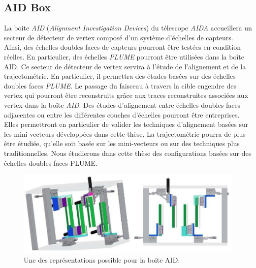   \subsection{AID Box}
  
  La boite \textit{AID} (\textit{Alignment Investigation Devices}) du t\'elescope \textit{AIDA} accueillera un secteur de d\'etecteur de vertex compos\'e d'un syst\`eme d'\'echelles de capteurs. Ainsi, des \'echelles doubles faces de capteurs pourront \^etre test\'ees en condition r\'eelles. En particulier, des \'echelles \textit{PLUME} pourront \^etre utilis\'ees dans la boîte AID. Ce secteur de d\'etecteur de vertex servira \`a l'\'etude de l'alignement et de la trajectom\'etrie. En particulier, il permettra des \'etudes bas\'ees sur des \'echelles doubles faces \textit{PLUME}. Le passage du faisceau à travers la cible engendre des vertex qui pourront \^etre reconstruits grâce aux traces reconstruites associ\'ees aux vertex dans la boîte \textit{AID}. Des \'etudes d'alignement entre \'echelles doubles faces adjacentes ou entre les diff\'erentes couches d'\'echelles pourront \^etre entreprises. Elles permettront en particulier de valider les techniques d'alignement bas\'ees sur les mini-vecteurs d\'evelopp\'ees dans cette th\`ese. La trajectom\'etrie pourra de plus \^etre \'etudi\'ee, qu'elle soit bas\'ee sur les mini-vecteurs ou sur des techniques plus traditionnelles. Nous \'etudierons dans cette th\`ese des configurations bas\'ees sur des \'echelles doubles faces PLUME.
  

  \begin{figure}[!htb]
    \begin{center} 
      \includegraphics[scale=0.40]{./figures/AID_design.png}
      \caption{Une des repr\'esentations possible pour la boite AID.}
      \label{fig:AID_design}
    \end{center}
  \end{figure}
  
